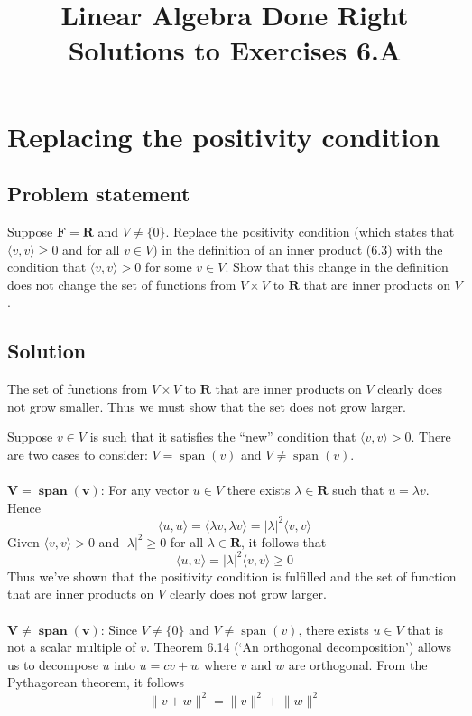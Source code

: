 \documentclass{article}
\title{Linear Algebra Done Right\\Solutions to Exercises 6.A}
\author{}
\date{}
\providecommand{\abs}[1]{\lvert#1\rvert} \providecommand{\norm}[1]{\lVert#1\rVert}
\begin{document}
\maketitle

\renewcommand{\thesection}{3}
\section{Replacing the positivity condition}
\subsection*{Problem statement}
Suppose $\mathbf{F}=\mathbf{R}$ and $V\neq \{0\}$. 
Replace the positivity condition (which states that $\langle v, v\rangle\geq 0$ and for all $v\in V$) in the definition of an inner product (6.3) with the condition that $\langle v, v\rangle > 0$ for some $v\in V$. 
Show that this change in the definition does not change the set of functions from $V\times V$ to $\mathbf{R}$ that are inner products on $V$.

\subsection*{Solution}
The set of functions from $V\times V$ to $\mathbf{R}$ that are inner products on $V$ clearly does not grow smaller. 
Thus we must show that the set does not grow larger.

Suppose $v\in V$ is such that it satisfies the ``new'' condition that $\langle v, v\rangle > 0$. 
There are two cases to consider: $V=\operatorname{span}(v)$ and $V\neq\operatorname{span}(v)$.
\\
\\
$\mathbf{{V=\operatorname{\textbf{span}}(v)}}$: For any vector $u\in V$ there exists $\lambda\in\mathbf{R}$ such that $u=\lambda v$. 
Hence 
\[\langle u, u\rangle =\langle \lambda v, \lambda v \rangle = \abs{\lambda}^2\langle v, v\rangle \]
Given $\langle v, v\rangle > 0$ and $|\lambda|^2\geq 0$ for all $\lambda\in\mathbf{R}$, it follows that 
\[\langle u, u\rangle = |\lambda|^2\langle v, v\rangle \geq 0\]
Thus we've shown that the positivity condition is fulfilled and the set of function that are inner products on $V$ clearly does not grow larger.
\\
\\
$\mathbf{V\neq\operatorname{\textbf{span}}(v)}$: Since $V\neq \{0\}$ and $V\neq\operatorname{span}(v)$, there exists $u\in V$ that is not a scalar multiple of $v$. 
Theorem 6.14 (`An orthogonal decomposition') allows us to decompose $u$ into $u=cv+w$ where $v$ and $w$ are orthogonal. 
From the Pythagorean theorem, it follows
\[\norm{v+w}^2=\norm{v}^2+\norm{w}^2\]
\end{document}
